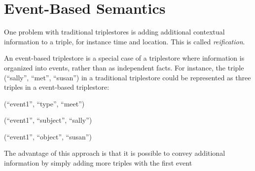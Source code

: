 \documentclass[../main.tex]{subfiles}
\begin{document}
\chapter {Event-Based Semantics}

One problem with traditional triplestores is adding additional contextual information to a triple, for instance time and location.  This is called {\em reification}.

An event-based triplestore is a special case of a triplestore where information is organized into events, rather than as independent facts.  For instance, the triple (``sally'', ``met'', ``susan'') in a traditional triplestore could be represented as three triples in a event-based triplestore:

(``event1'', ``type'', ``meet'')

(``event1'', ``subject'', ``sally'')

(``event1'', ``object'', ``susan'')

The advantage of this approach is that it is possible to convey additional information by simply adding more triples with the first event
\end{document}
